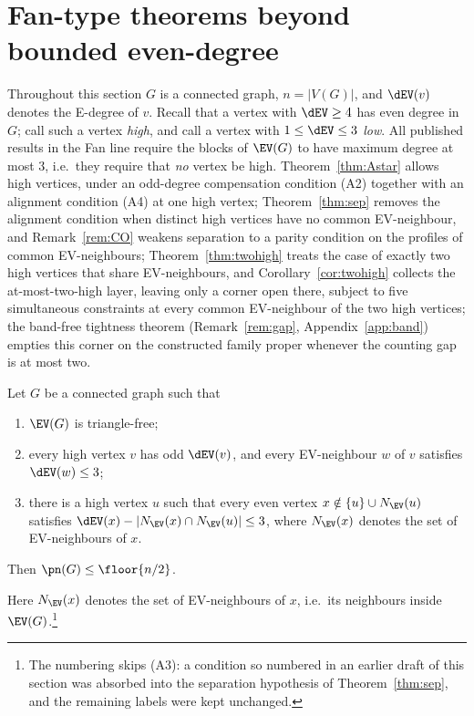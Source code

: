 \section{Fan-type theorems beyond bounded even-degree}\label{sec:astar}

Throughout this section $G$ is a connected graph, $n=|V(G)|$, and $\dEV(v)$ denotes the E-degree
of $v$. Recall that a vertex with $\dEV\ge 4$ has even degree in $G$; call such a vertex
\emph{high}, and call a vertex with $1\le \dEV\le 3$ \emph{low}. All published results in the
Fan line \cite{Fan05,BS21,FHZ23} require the blocks of $\EV(G)$ to have maximum degree at most
$3$, i.e.\ they require that \emph{no} vertex be high. Theorem~\ref{thm:Astar} allows high
vertices, under an odd-degree compensation condition (A2) together with an alignment condition
(A4) at one high vertex; Theorem~\ref{thm:sep} removes the alignment condition when distinct
high vertices have no common EV-neighbour, and Remark~\ref{rem:CO} weakens separation to a
parity condition on the profiles of common EV-neighbours; Theorem~\ref{thm:twohigh} treats the
case of exactly two high vertices that share EV-neighbours, and Corollary~\ref{cor:twohigh}
collects the at-most-two-high layer, leaving only a corner open there, subject to five
simultaneous constraints at every common EV-neighbour of the two high vertices; the
band-free tightness theorem (Remark~\ref{rem:gap}, Appendix~\ref{app:band}) empties this
corner on the constructed family proper whenever the counting gap is at most two.

\begin{theorem}\label{thm:Astar}
Let $G$ be a connected graph such that
\begin{enumerate}[label={},leftmargin=2.6em]
\item[(A1)] $\EV(G)$ is triangle-free;
\item[(A2)] every high vertex $v$ has odd $\dEV(v)$, and every EV-neighbour $w$ of $v$
satisfies $\dEV(w)\le 3$;
\item[(A4)] there is a high vertex $u$ such that every even vertex
$x\notin\{u\}\cup N_{\EV}(u)$ satisfies
$\dEV(x)-|N_{\EV}(x)\cap N_{\EV}(u)|\le 3$, where
$N_{\EV}(x)$ denotes the set of EV-neighbours of $x$.
\end{enumerate}
Then $\pn(G)\le \floor{n/2}$.
\end{theorem}

Here $N_{\EV}(x)$ denotes the set of EV-neighbours of $x$, i.e.\ its neighbours inside
$\EV(G)$.\footnote{The numbering skips (A3): a condition so numbered in an earlier draft of
this section was absorbed into the separation hypothesis of
Theorem~\ref{thm:sep}, and the remaining labels were kept unchanged.}


